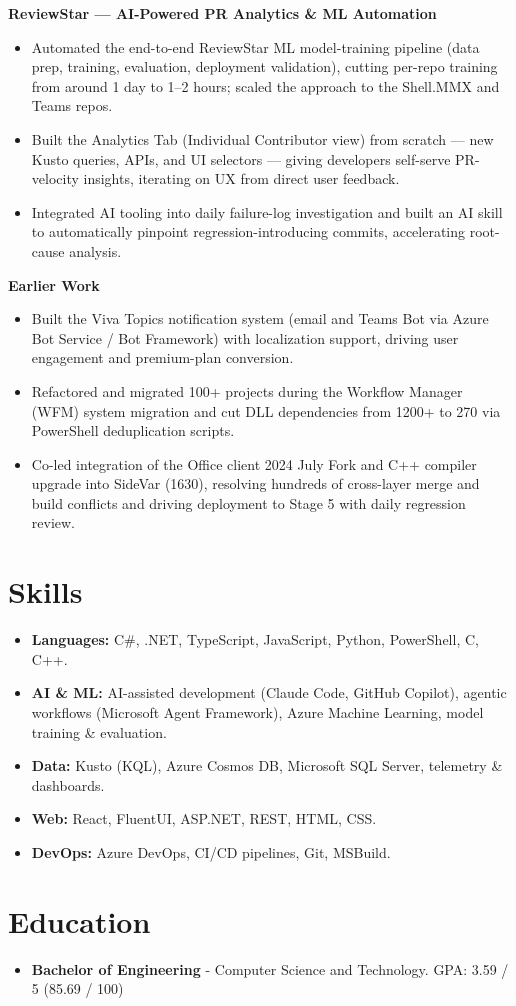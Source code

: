 \documentclass{resume}
\begin{document}
\textbf{ReviewStar — AI-Powered PR Analytics \& ML Automation}
\begin{itemize}
  \item Automated the end-to-end ReviewStar ML model-training pipeline (data prep, training, evaluation, deployment validation), cutting per-repo training from around 1 day to 1--2 hours; scaled the approach to the Shell.MMX and Teams repos.
  \item Built the Analytics Tab (Individual Contributor view) from scratch — new Kusto queries, APIs, and UI selectors — giving developers self-serve PR-velocity insights, iterating on UX from direct user feedback.
  \item Integrated AI tooling into daily failure-log investigation and built an AI skill to automatically pinpoint regression-introducing commits, accelerating root-cause analysis.
\end{itemize}

\textbf{Earlier Work}
\begin{itemize}
  \item Built the Viva Topics notification system (email and Teams Bot via Azure Bot Service / Bot Framework) with localization support, driving user engagement and premium-plan conversion.
  \item Refactored and migrated 100+ projects during the Workflow Manager (WFM) system migration and cut DLL dependencies from 1200+ to 270 via PowerShell deduplication scripts.
  \item Co-led integration of the Office client 2024 July Fork and C++ compiler upgrade into SideVar (1630), resolving hundreds of cross-layer merge and build conflicts and driving deployment to Stage 5 with daily regression review.
\end{itemize}

\section{Skills}
\begin{itemize}[parsep=0.5ex]
  \item \textbf{Languages:} C\#, .NET, TypeScript, JavaScript, Python, PowerShell, C, C++.
  \item \textbf{AI \& ML:} AI-assisted development (Claude Code, GitHub Copilot), agentic workflows (Microsoft Agent Framework), Azure Machine Learning, model training \& evaluation.
  \item \textbf{Data:} Kusto (KQL), Azure Cosmos DB, Microsoft SQL Server, telemetry \& dashboards.
  \item \textbf{Web:} React, FluentUI, ASP.NET, REST, HTML, CSS.
  \item \textbf{DevOps:} Azure DevOps, CI/CD pipelines, Git, MSBuild.
\end{itemize}

\section{Education}
\begin{itemize}
  \item \textbf{Bachelor of Engineering} - Computer Science and Technology. GPA: 3.59 / 5 (85.69 / 100)
\end{itemize}
\end{document}
